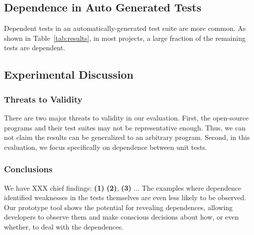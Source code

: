 \subsection{Dependence in Auto Generated Tests}
\label{sec:autotest}

Dependent tests in an automatically-generated test suite
are more common.  As shown in Table~\ref{tab:results}, in most
projects, a large fraction of the remaining tests are dependent.




\subsection{Experimental Discussion}

\subsubsection{Threats to Validity}

There are two major threats to validity in our evaluation.
First, the  open-source
programs and their test suites may not be
representative enough. Thus, we can not claim the results
can be generalized to an arbitrary program.
Second, in this evaluation, we focus specifically on
dependence between unit tests.

\subsubsection{Conclusions}


We have XXX chief findings: \textbf{(1)}
\textbf{(2)}, \textbf{(3)} ...
The examples where dependence identified weaknesses in the tests themselves
are even less likely to be observed.  
Our prototype tool shows
the potential for revealing dependences, allowing
developers to observe them and make conscious decisions about how, or even whether,
to deal with the dependences. 
